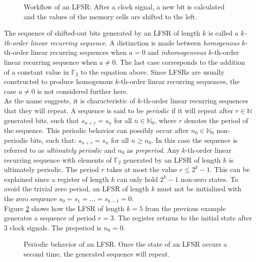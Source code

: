 \begin{figure}[h]
	\centering
	
	\caption{Workflow of an LFSR: After a clock signal, a new bit is calculated and the values of the memory cells are shifted to the left.}
	\label{fig:Figure_4}
\end{figure}

The sequence of shifted-out bits generated by an LFSR of length $k$ is called a \textit{$k$-th-order linear recurring sequence}. A distinction is made between \textit{homogenous} $k$-th-order linear recurring sequences when $a=0$ and \textit{inhomogeneous} $k$-th-order linear recurring sequence when $a\neq0$. The last case corresponds to the addition of a constant value in $\mathbb{F}_2$ to the equation above. \cite[p. 186]{Lidl.1986} Since LFSRs are usually constructed to produce homogenous $k$-th-order linear recurring sequences, the case $a\neq0$ is not considered further here. \\

As the name suggests, it is characteristic of $k$-th-order linear recurring sequences that they will repeat. A sequence is said to be \textit{periodic} if it will repeat after $r\in\mathbb{N}$ generated bits, such that $s_{n+r}=s_n$ for all $n\in\mathbb{N}_0$, where $r$ denotes the period of the sequence. This periodic behavior can possibly occur after $n_0\in\mathbb{N}_0$ non-periodic bits, such that: $s_{n+r}=s_n$ for all $n\ge{n_{0}}$. In this case the sequence is referred to as \textit{ultimately periodic} and $n_0$ as \textit{preperiod}. Any $k$-th-order linear recurring sequence with elements of $\mathbb{F}_2$ generated by an LFSR of length $k$ is ultimately periodic. The period $r$ takes at most the value $r\le2^{k}-1$. This can be explained since a register of length $k$ can only hold $2^{k}-1$ non-zero states. To avoid the trivial zero period, an LFSR of length $k$ must not be initialized with the zero sequence $s_0=s_1=\ldots=s_{k-1}=0$. \cite[p. 189]{Lidl.1986} \\

Figure \ref{fig:Figure_5} shows how the LFSR of length $k=5$ from the previous example generates a sequence of period $r=3$. The register returns to the initial state after $3$ clock signals. The preperiod is $n_0=0$.

\begin{figure}[h]
	\centering
	
	\caption{Periodic behavior of an LFSR. Once the state of an LFSR occurs a second time, the generated sequence will repeat.}
	\label{fig:Figure_5}
\end{figure}

